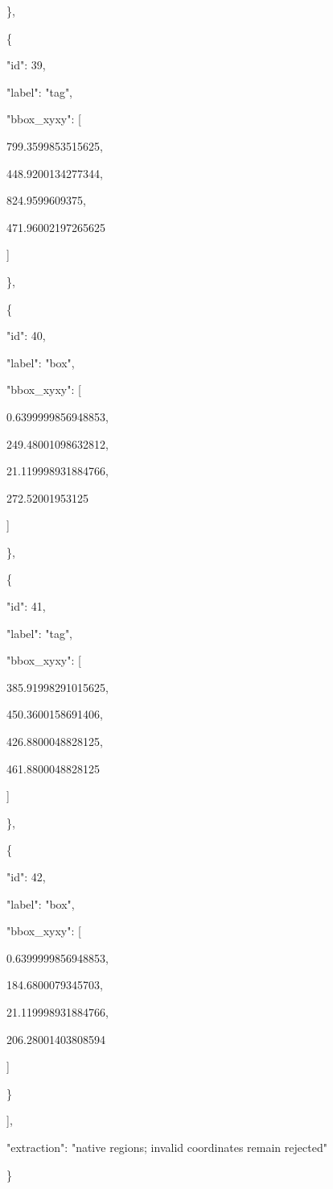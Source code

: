 \documentclass[10pt,a4paper]{article}
\begin{document}
    \},\allowbreak{}\par
    \{\par
      "id":\allowbreak{} 39,\allowbreak{}\par
      "label":\allowbreak{} "tag",\allowbreak{}\par
      "bbox\_xyxy":\allowbreak{} [\par
        799.3599853515625,\allowbreak{}\par
        448.9200134277344,\allowbreak{}\par
        824.9599609375,\allowbreak{}\par
        471.96002197265625\par
      ]\par
    \},\allowbreak{}\par
    \{\par
      "id":\allowbreak{} 40,\allowbreak{}\par
      "label":\allowbreak{} "box",\allowbreak{}\par
      "bbox\_xyxy":\allowbreak{} [\par
        0.6399999856948853,\allowbreak{}\par
        249.48001098632812,\allowbreak{}\par
        21.119998931884766,\allowbreak{}\par
        272.52001953125\par
      ]\par
    \},\allowbreak{}\par
    \{\par
      "id":\allowbreak{} 41,\allowbreak{}\par
      "label":\allowbreak{} "tag",\allowbreak{}\par
      "bbox\_xyxy":\allowbreak{} [\par
        385.91998291015625,\allowbreak{}\par
        450.3600158691406,\allowbreak{}\par
        426.8800048828125,\allowbreak{}\par
        461.8800048828125\par
      ]\par
    \},\allowbreak{}\par
    \{\par
      "id":\allowbreak{} 42,\allowbreak{}\par
      "label":\allowbreak{} "box",\allowbreak{}\par
      "bbox\_xyxy":\allowbreak{} [\par
        0.6399999856948853,\allowbreak{}\par
        184.6800079345703,\allowbreak{}\par
        21.119998931884766,\allowbreak{}\par
        206.28001403808594\par
      ]\par
    \}\par
  ],\allowbreak{}\par
  "extraction":\allowbreak{} "native regions; invalid coordinates remain rejected"\par
\}
\end{document}
